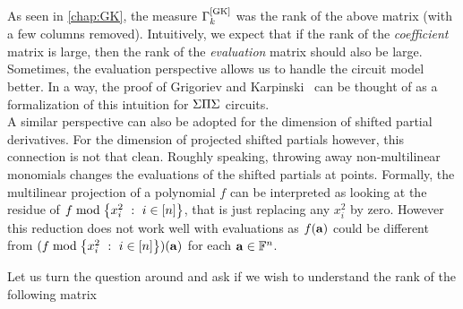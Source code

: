 
As seen in \autoref{chap:GK}, the measure $\Gamma^{\mathrm{[GK]}}_k$ was the rank of the above matrix (with a few columns removed).
Intuitively, we expect that if the rank of the \emph{coefficient} matrix is large, then the rank of the \emph{evaluation} matrix should also be large.
Sometimes, the evaluation perspective allows us to handle the circuit model better.
In a way, the proof of Grigoriev and Karpinski~\cite{grigoriev98} can be thought of as a formalization of this intuition for $\Sigma\Pi\Sigma$ circuits.
\\

A similar perspective can also be adopted for the dimension of shifted partial derivatives.
For the dimension of projected shifted partials however, this connection is not that clean.
Roughly speaking, throwing away non-multilinear monomials changes the evaluations of the shifted partials at points.
Formally, the multilinear projection of a polynomial $f$ can be interpreted as looking at the residue of $f \bmod \left\{{x_i^2}\ : \ {i\in [n]}\right\}$, that is just replacing any $x_i^2$ by zero.
However this reduction does not work well with evaluations as $f(\mathbf{a})$ could be different from $(f \bmod \left\{{x_i^2}\ : \ {i\in [n]}\right\})(\mathbf{a})$ for each $\mathbf{a} \in \mathbb{F}^n$. 

Let us turn the question around and ask if we wish to understand the rank of the following matrix

